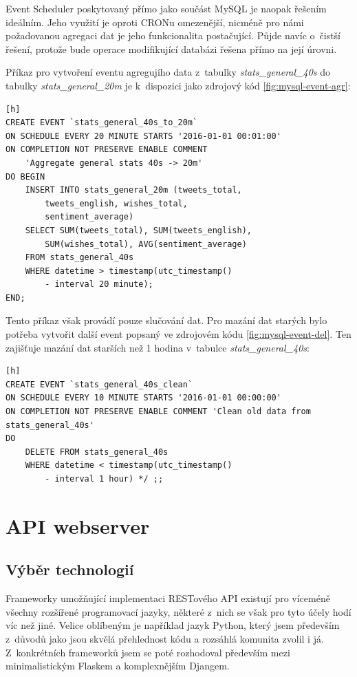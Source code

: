 \documentclass[thesis=B,czech]{FITthesis}[2012/06/26]
\begin{document}
	Event Scheduler\cite{event-scheduler} poskytovaný přímo jako součást MySQL je naopak řešením ideálním. Jeho využití je oproti CRONu omezenější, nicméně pro námi požadovanou agregaci dat je jeho funkcionalita postačující. Půjde navíc o~čistší řešení, protože bude operace modifikující databázi řešena přímo na její úrovni. 
	
	Příkaz pro vytvoření eventu agregujího data z~tabulky \textit{stats\_general\_40s} do tabulky \textit{stats\_general\_20m} je k~dispozici jako zdrojový kód \ref{fig:mysql-event-agr}:

\begin{lstlisting}[caption={MySQL Event provádějící agregaci dat},label=fig:mysql-event-agr][h]
CREATE EVENT `stats_general_40s_to_20m` 
ON SCHEDULE EVERY 20 MINUTE STARTS '2016-01-01 00:01:00' 
ON COMPLETION NOT PRESERVE ENABLE COMMENT 
	'Aggregate general stats 40s -> 20m' 
DO BEGIN 
	INSERT INTO stats_general_20m (tweets_total, 
		tweets_english, wishes_total, 
		sentiment_average) 
	SELECT SUM(tweets_total), SUM(tweets_english), 
		SUM(wishes_total), AVG(sentiment_average) 
	FROM stats_general_40s 
	WHERE datetime > timestamp(utc_timestamp() 
		- interval 20 minute); 
END;
\end{lstlisting}


Tento příkaz však provádí pouze slučování dat. Pro mazání dat starých bylo potřeba vytvořit další event popsaný ve zdrojovém kódu \ref{fig:mysql-event-del}. Ten zajišťuje mazání dat starších než 1 hodina v~tabulce \textit{stats\_general\_40s}:

\begin{lstlisting}[caption={MySQL Event provádějící smazání starých dat},label=fig:mysql-event-del][h]
CREATE EVENT `stats_general_40s_clean` 
ON SCHEDULE EVERY 10 MINUTE STARTS '2016-01-01 00:00:00' 
ON COMPLETION NOT PRESERVE ENABLE COMMENT 'Clean old data from stats_general_40s' 
DO 
	DELETE FROM stats_general_40s
	WHERE datetime < timestamp(utc_timestamp() 
		- interval 1 hour) */ ;;
\end{lstlisting}

\section{API webserver}
\subsection{Výběr technologií}
	Frameworky umožňující implementaci RESTového API existují pro víceméně všechny rozšířené programovací jazyky, některé z~nich se však pro tyto účely hodí víc než jiné. Velice oblíbeným je například jazyk Python, který jsem především z~důvodů jako jsou skvělá přehlednost kódu a rozsáhlá komunita zvolil i já. Z~konkrétních frameworků jsem se poté rozhodoval především mezi minimalistickým Flaskem\cite{flask} a komplexnějším Djangem\cite{django}. 
	
\end{document}

